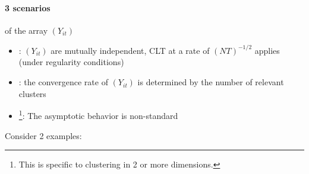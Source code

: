 \documentclass[twoside]{article}
\begin{document}
\paragraph*{3 scenarios} of the array $(Y_{it})$
\begin{itemize}
    \item {}: $(Y_{it})$ are mutually independent, CLT at a rate of $(NT)^{-1/2}$ applies (under regularity conditions)
    \item {}: the convergence rate of $(Y_{it})$ is determined by the number of relevant clusters 
    \item {}\footnote{This is specific to clustering in 2 or more dimensions.}: The asymptotic behavior is non-standard
\end{itemize}
Consider 2 examples:
\end{document}
